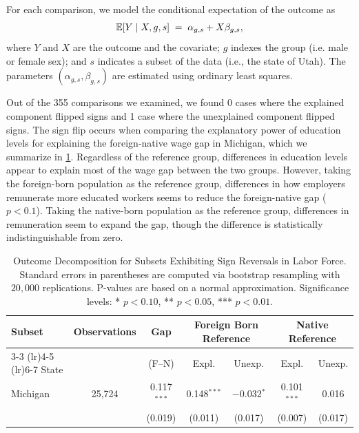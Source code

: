 For each comparison, we model the conditional expectation of the outcome as
\[
    \mathbb{E}[Y \mid X, g, s] \;=\; \alpha_{g,s} + X \beta_{g,s},
\]
where \( Y \) and \( X \) are the outcome and the covariate;
\( g \) indexes the group (i.e. male or female sex);
and \( s \) indicates a subset of the data (i.e., the state of Utah).
The parameters $(\alpha_{g,s},\beta_{g,s})$ are estimated using ordinary least squares.

Out of the 355 comparisons we examined, we found 0 cases where the explained component flipped signs and 1 case where the unexplained component flipped signs.
The sign flip occurs when comparing the explanatory power of education levels for explaining the foreign-native wage gap in Michigan, which we summarize in \cref{tab:us_census_flips}.
Regardless of the reference group, differences in education levels appear to explain most of the wage gap between the two groups.
However, taking the foreign-born population as the reference group, differences in how employers remunerate more educated workers seems to reduce the foreign-native gap ($p < 0.1$).
Taking the native-born population as the reference group, differences in remuneration seem to expand the gap, though the difference is statistically indistinguishable from zero.

\begin{table}[H]
    \centering
    \caption{Outcome Decomposition for Subsets Exhibiting Sign Reversals in Labor Force. Standard errors in parentheses are computed via bootstrap resampling with $20{,}000$ replications.  
    P-values are based on a normal approximation.  
    Significance levels: * $p<0.10$, ** $p<0.05$, *** $p<0.01$. }
    \label{tab:us_census_flips}
    \scriptsize
    \begin{tabular}{@{}lc*{5}{c}@{}}
    \toprule
    \multirow{2}{*}{Subset} &
    \multirow{2}{*}{Observations} &
    Gap &
    \multicolumn{2}{c}{Foreign Born Reference} &
    \multicolumn{2}{c}{Native Reference} \\
    \cmidrule(lr){3-3} \cmidrule(lr){4-5} \cmidrule(lr){6-7}
    State &  & (F–N) & Expl. & Unexp. & Expl. & Unexp. \\
    \midrule
    
    Michigan & 25,724 & 0.117$^{***}$ & 0.148$^{***}$  & \(-0.032\)$^{*}$ & 0.101$^{***}$ & 0.016   \\
             &        & (0.019)       & (0.011)        & (0.017)          & (0.007)       & (0.017) \\ [0.3em]
    \bottomrule
    \end{tabular}    
\end{table}